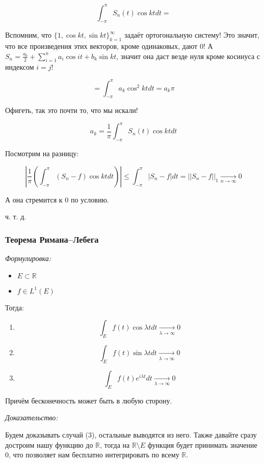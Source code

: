 \documentclass{article}
\def\goesto#1{\underset{#1}{\longrightarrow}}
\def\toinf#1{\goesto{#1 \rightarrow \infty}}
\def\ntoinf{\toinf{n}}
\begin{document}
\[\int_{-\pi}^{\pi} S_n(t) \cos kt dt = \]

Вспомним, что $\{1, \cos kt, \sin kt\}_{k = 1}^{\infty}$ задаёт ортогональную систему! Это значит, что все произведения этих векторов, кроме одинаковых, дают 0! А $S_n = \frac{a_0}{2} + \sum_{i = 1}^{n} a_i \cos it + b_k \sin kt$, значит она даст везде нуля кроме косинуса с индексом $i = j$!

\[ = \int_{-\pi}^{\pi} a_k \cos^2 kt dt = a_k \pi\]

Офигеть, так это почти то, что мы искали!

\[a_k = \frac{1}{\pi} \int_{-\pi}^{\pi} S_n(t) \cos kt dt\]

Посмотрим на разницу:

\[\left|\frac{1}{\pi} \left( \int_{-\pi}^{\pi} (S_n - f) \cos kt dt \right)\right| \le \int_{-\pi}^{\pi} |S_n - f| dt = ||S_n - f||_1 \ntoinf 0\]

А она стремится к 0 по условию.

ч. т. д. 

\subsubsection{Теорема Римана--Лебега}
\textit{Формулировка:}

\begin{itemize}
    \item $E \subset \mathbb{R}$
    \item $f \in L^1(E)$
\end{itemize}

Тогда:

\begin{enumerate}
    \item \[\int_{E} f(t) \cos \lambda t dt \goesto{\lambda \rightarrow \infty} 0\]
    \item \[\int_{E} f(t) \sin \lambda t dt \goesto{\lambda \rightarrow \infty} 0\]
    \item \[\int_{E} f(t) e^{i \lambda t} dt \goesto{\lambda \rightarrow \infty} 0\]
\end{enumerate}

Причём бесконечность может быть в любую сторону.

\textit{Доказательство:}

Будем доказывать случай (3), остальные выводятся из него. Также давайте сразу достроим нашу функцию до $\mathbb{R}$, тогда на $\mathbb{R} \setminus E$ функция будет принимать значение 0, что позволяет нам бесплатно интегрировать по всему $\mathbb{R}$.
\end{document}
